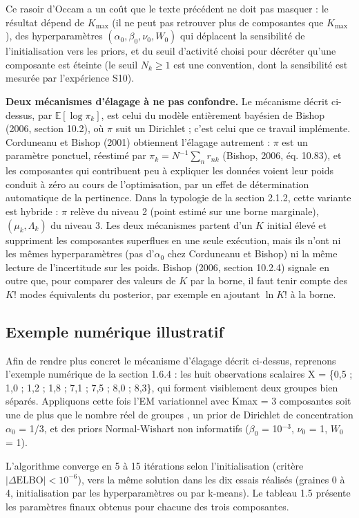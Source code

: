 Ce rasoir d'Occam a un coût que le texte précédent ne doit pas masquer : le résultat dépend de $K_{\max}$ (il ne peut pas retrouver plus de composantes que $K_{\max}$), des hyperparamètres $(\alpha_0, \beta_0, \nu_0, W_0)$ qui déplacent la sensibilité de l'initialisation vers les priors, et du seuil d'activité choisi pour décréter qu'une composante est éteinte (le seuil $N_k \geq 1$ est une convention, dont la sensibilité est mesurée par l'expérience S10).

\textbf{Deux mécanismes d'élagage à ne pas confondre. }Le mécanisme décrit ci-dessus, par $\mathbb{E}[\log \pi_k]$, est celui du modèle entièrement bayésien de Bishop (2006, section 10.2), où $\pi$ suit un Dirichlet ; c'est celui que ce travail implémente. Corduneanu et Bishop (2001) obtiennent l'élagage autrement : $\pi$ est un paramètre ponctuel, réestimé par $\pi_k = N^{-1}\sum_n r_{nk}$ (Bishop, 2006, éq. 10.83), et les composantes qui contribuent peu à expliquer les données voient leur poids conduit à zéro au cours de l'optimisation, par un effet de détermination automatique de la pertinence. Dans la typologie de la section 2.1.2, cette variante est hybride : $\pi$ relève du niveau 2 (point estimé sur une borne marginale), $(\mu_k, \Lambda_k)$ du niveau 3. Les deux mécanismes partent d'un $K$ initial élevé et suppriment les composantes superflues en une seule exécution, mais ils n'ont ni les mêmes hyperparamètres (pas d'$\alpha_0$ chez Corduneanu et Bishop) ni la même lecture de l'incertitude sur les poids. Bishop (2006, section 10.2.4) signale en outre que, pour comparer des valeurs de $K$ par la borne, il faut tenir compte des $K!$ modes équivalents du posterior, par exemple en ajoutant $\ln K!$ à la borne.

\subsection{Exemple numérique illustratif}
Afin de rendre plus concret le mécanisme d'élagage décrit ci-dessus, reprenons l'exemple numérique de la section 1.6.4 : les huit observations scalaires X = \{0,5 ; 1,0 ; 1,2 ; 1,8 ; 7,1 ; 7,5 ; 8,0 ; 8,3\}, qui forment visiblement deux groupes bien séparés. Appliquons cette fois l'EM variationnel avec Kmax = 3 composantes  soit une de plus que le nombre réel de groupes , un prior de Dirichlet de concentration $\alpha _{0}$ = 1/3, et des priors Normal-Wishart non informatifs ($\beta _{0}$ = 10$^{-3}$, $\nu _{0}$ = 1, $W_{0}$ = 1).

L'algorithme converge en 5 à 15 itérations selon l'initialisation (critère $|\Delta \mathrm{ELBO}| < 10^{-6}$), vers la même solution dans les dix essais réalisés (graines 0 à 4, initialisation par les hyperparamètres ou par k-means). Le tableau 1.5 présente les paramètres finaux obtenus pour chacune des trois composantes.

